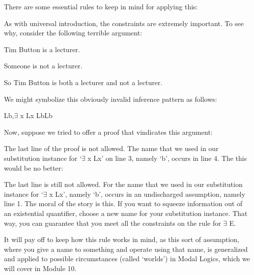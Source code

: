 There are some essential rules to keep in mind for applying this:

As with universal introduction, the constraints are extremely important. To see why, consider the following terrible argument:
\begin{earg}
\item[]Tim Button is a lecturer.
\item[]Someone is not a lecturer.
\item[]So Tim Button is both a lecturer and not a lecturer.
\end{earg}
We might symbolize this obviously invalid inference pattern as follows:
\begin{center}
Lb,$\exists$ x \enot Lx \therefore  Lb\eand \enot Lb
\end{center}
Now, suppose we tried to offer a proof that vindicates this argument:
\begin{fitchproof}
\open
\close
{}	
\end{fitchproof}
The last line of the proof is not allowed. The name that we used in our substitution instance for ‘$\exists$ x \enot Lx’ on line 3, namely ‘b’, occurs in line 4. The this would be no better:
\begin{fitchproof}
\open
{}
\close
{}	
\end{fitchproof}

The last line is still not allowed. For the name that we used in our substitution instance for ‘$\exists$ x \enot Lx’, namely ‘b’, occurs in an undischarged assumption, namely line 1. The moral of the story is this. If you want to squeeze information out of an existential quantifier, choose a new name for your substitution instance. That way, you can guarantee that you meet all the constraints on the rule for $\exists$ E.

It will pay off to keep how this rule works in mind, as this sort of assumption, where you give a name to something and operate using that name, is generalized and applied to possible circumstances (called ‘worlds') in Modal Logics, which we will cover in Module 10.

